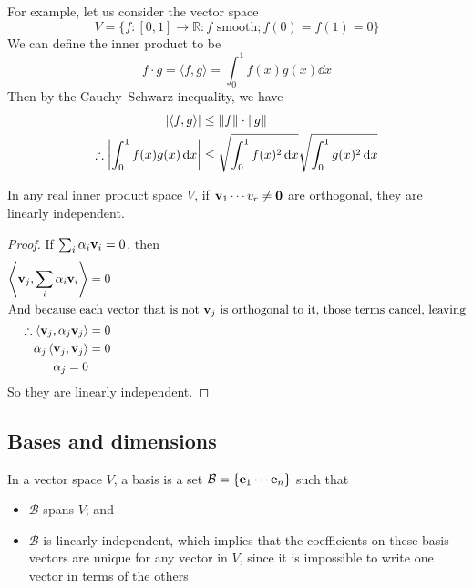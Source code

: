 For example, let us consider the vector space
\[
	V = \{ f: [0, 1] \to \mathbb R: f \text{ smooth}; f(0) = f(1) = 0 \}
\]
We can define the inner product to be
\[
	f \cdot g = \langle f, g \rangle = \int_0^1 f(x)g(x)\dd{x}
\]
Then by the Cauchy--Schwarz inequality, we have
\begin{align*}
	\abs{\langle f, g \rangle}               & \leq \norm{f} \cdot \norm{g}                                    \\
	\therefore \abs{\int_0^1 f(x)g(x)\dd{x}} & \leq \sqrt{\int_0^1 f(x)^2 \dd{x}}\sqrt{\int_0^1 g(x)^2 \dd{x}}
\end{align*}

\begin{lemma}
	In any real inner product space \(V\), if \(\vb v_1 \cdots v_r \neq \vb 0\) are orthogonal, they are linearly independent.
\end{lemma}
\begin{proof}
	If \(\sum_i \alpha_i \vb v_i = 0\), then
	\begin{align*}
		\left\langle \vb v_j, \sum_i \alpha_i \vb v_i \right\rangle     & = 0 \\
		\intertext{And because each vector that is not \(\vb v_j\) is orthogonal to it, those terms cancel, leaving}
		\therefore \left\langle \vb v_j, \alpha_j \vb v_j \right\rangle & = 0 \\
		\alpha_j \left\langle \vb v_j, \vb v_j \right\rangle            & = 0 \\
		\alpha_j = 0
	\end{align*}
	So they are linearly independent.
\end{proof}

\subsection{Bases and dimensions}
In a vector space \(V\), a basis is a set \(\mathcal B = \{ \vb e_1 \cdots \vb e_n \}\) such that
\begin{itemize}
	\item \(\mathcal B\) spans \(V\); and
	\item \(\mathcal B\) is linearly independent, which implies that the coefficients on these basis vectors are unique for any vector in \(V\), since it is impossible to write one vector in terms of the others
\end{itemize}

